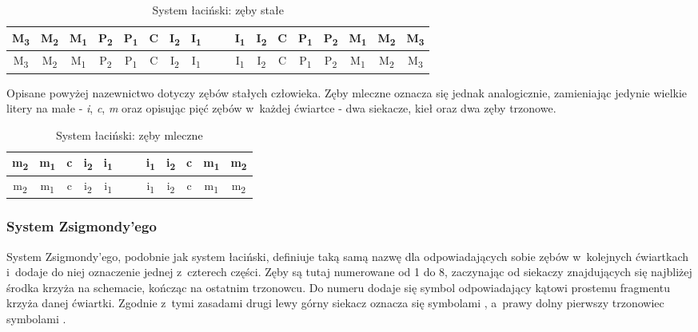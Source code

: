 \begin{table}[h t]
\centering
\begin{tabular}{c c c c c c c c c | c c c c c c c c c}
M\textsubscript{3} & M\textsubscript{2} & M\textsubscript{1} & P\textsubscript{2} & P\textsubscript{1} & C & I\textsubscript{2} & I\textsubscript{1} &&& I\textsubscript{1} & I\textsubscript{2} & C & P\textsubscript{1} & P\textsubscript{2} & M\textsubscript{1} & M\textsubscript{2} & M\textsubscript{3}
\\ [1ex] \hline \rule{0pt}{1.2\normalbaselineskip}
M\textsubscript{3} & M\textsubscript{2} & M\textsubscript{1} & P\textsubscript{2} & P\textsubscript{1} & C & I\textsubscript{2} & I\textsubscript{1} &&& I\textsubscript{1} & I\textsubscript{2} & C & P\textsubscript{1} & P\textsubscript{2} & M\textsubscript{1} & M\textsubscript{2} & M\textsubscript{3}
\end{tabular}
\caption{\label{tab:tab1} System łaciński: zęby stałe}
\end{table}

Opisane powyżej nazewnictwo dotyczy zębów stałych człowieka. Zęby mleczne oznacza się jednak analogicznie, zamieniając jedynie wielkie litery na małe - \textit{i}, \textit{c}, \textit{m} oraz opisując pięć zębów w~każdej ćwiartce - dwa siekacze, kieł oraz dwa zęby trzonowe.

\begin{table}[h t]
\centering
\begin{tabular}{c c c c c c | c c c c c c}
m\textsubscript{2} & m\textsubscript{1} & c & i\textsubscript{2} & i\textsubscript{1} &&& i\textsubscript{1} & i\textsubscript{2} & c & m\textsubscript{1} & m\textsubscript{2}
\\ [1ex] \hline \rule{0pt}{1.2\normalbaselineskip}
m\textsubscript{2} & m\textsubscript{1} & c & i\textsubscript{2} & i\textsubscript{1} &&& i\textsubscript{1} & i\textsubscript{2} & c & m\textsubscript{1} & m\textsubscript{2}
\end{tabular}
\caption{\label{tab:tab2} System łaciński: zęby mleczne}
\end{table}

\subsubsection{System Zsigmondy’ego}

System Zsigmondy'ego, podobnie jak system łaciński, definiuje taką samą nazwę dla odpowiadających sobie zębów w~kolejnych ćwiartkach i~dodaje do niej oznaczenie jednej z~czterech części. Zęby są tutaj numerowane od 1 do 8, zaczynając od siekaczy znajdujących się najbliżej środka krzyża na schemacie, kończąc na ostatnim trzonowcu. Do numeru dodaje się symbol odpowiadający kątowi prostemu fragmentu krzyża danej ćwiartki. Zgodnie z~tymi zasadami drugi lewy górny siekacz oznacza się symbolami , a~prawy dolny pierwszy trzonowiec symbolami .\\

